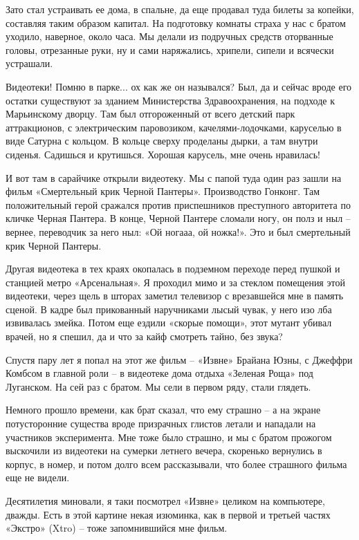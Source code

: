 Зато стал устраивать ее дома, в спальне, да еще продавал туда билеты за копейки, составляя таким образом капитал. На подготовку комнаты страха у нас с братом уходило, наверное, около часа. Мы делали из подручных средств оторванные головы, отрезанные руки, ну и сами наряжались, хрипели, сипели и всячески устрашали.

Видеотеки! Помню в парке... ох как же он назывался? Был, да и сейчас вроде его остатки существуют за зданием Министерства Здравоохранения, на подходе к Марьинскому дворцу. Там был отгороженный от всего детский парк аттракционов, с электрическим паровозиком, качелями-лодочками, каруселью в виде Сатурна с кольцом. В кольце сверху проделаны дырки, а там внутри сиденья. Садишься и крутишься. Хорошая карусель, мне очень нравилась!

И вот там в сарайчике открыли видеотеку. Мы с папой туда один раз зашли на фильм «Смертельный крик Черной Пантеры». Производство Гонконг. Там положительный герой сражался против приспешников преступного авторитета по кличке Черная Пантера. В конце, Черной Пантере сломали ногу, он полз и ныл – вернее, переводчик за него ныл: «Ой ногааа, ой ножка!». Это и был смертельный крик Черной Пантеры.

Другая видеотека в тех краях окопалась в подземном переходе перед пушкой и станцией метро «Арсенальная». Я проходил мимо и за стеклом помещения этой видеотеки, через щель в шторах заметил телевизор с врезавшейся мне в память сценой. В кадре был прикованный наручниками лысый чувак, у него изо лба извивалась змейка. Потом еще ездили «скорые помощи», этот мутант убивал врачей, но я спешил, да и что за кайф смотреть тайно, без звука?

Спустя пару лет я попал на этот же фильм – «Извне» Брайана Юзны, с Джеффри Комбсом в главной роли – в видеотеке дома отдыха «Зеленая Роща» под Луганском. На сей раз с братом. Мы сели в первом ряду, стали глядеть. 

Немного прошло времени, как брат сказал, что ему страшно – а на экране потусторонние существа вроде призрачных глистов летали и нападали на участников эксперимента. Мне тоже было страшно, и мы с братом прожогом выскочили из видеотеки на сумерки летнего вечера, скоренько вернулись в корпус, в номер, и потом долго всем рассказывали, что более страшного фильма еще не видели.

Десятилетия миновали, я таки посмотрел «Извне» целиком на компьютере, дважды. Есть в этой картине некая изюминка, как в первой и третьей частях «Экстро» (Xtro) – тоже запомнившийся мне фильм.

